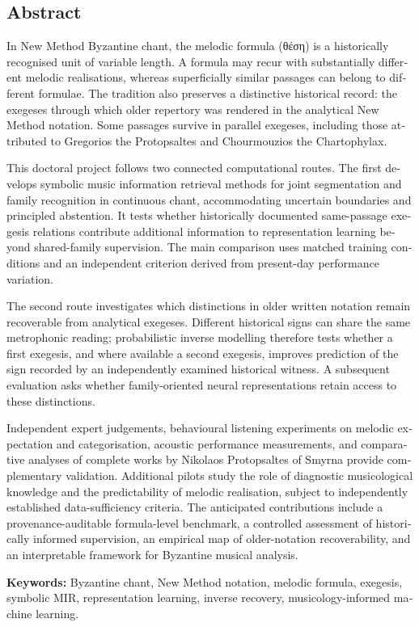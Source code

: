 \documentclass[11pt,a4paper]{article}
\begin{document}
\begin{otherlanguage}{english}
\section*{Abstract}
In New Method Byzantine chant, the melodic formula (\textgreek{θέση}) is a historically recognised unit of variable length. A formula may recur with substantially different melodic realisations, whereas superficially similar passages can belong to different formulae. The tradition also preserves a distinctive historical record: the exegeses through which older repertory was rendered in the analytical New Method notation. Some passages survive in parallel exegeses, including those attributed to Gregorios the Protopsaltes and Chourmouzios the Chartophylax.

This doctoral project follows two connected computational routes. The first develops symbolic music information retrieval methods for joint segmentation and family recognition in continuous chant, accommodating uncertain boundaries and principled abstention. It tests whether historically documented same-passage exegesis relations contribute additional information to representation learning beyond shared-family supervision. The main comparison uses matched training conditions and an independent criterion derived from present-day performance variation.

The second route investigates which distinctions in older written notation remain recoverable from analytical exegeses. Different historical signs can share the same metrophonic reading; probabilistic inverse modelling therefore tests whether a first exegesis, and where available a second exegesis, improves prediction of the sign recorded by an independently examined historical witness. A subsequent evaluation asks whether family-oriented neural representations retain access to these distinctions.

Independent expert judgements, behavioural listening experiments on melodic expectation and categorisation, acoustic performance measurements, and comparative analyses of complete works by Nikolaos Protopsaltes of Smyrna provide complementary validation. Additional pilots study the role of diagnostic musicological knowledge and the predictability of melodic realisation, subject to independently established data-sufficiency criteria. The anticipated contributions include a provenance-auditable formula-level benchmark, a controlled assessment of historically informed supervision, an empirical map of older-notation recoverability, and an interpretable framework for Byzantine musical analysis.

\noindent\textbf{Keywords:} Byzantine chant, New Method notation, melodic formula, exegesis, symbolic MIR, representation learning, inverse recovery, musicology-informed machine learning.
\end{otherlanguage}
\end{document}
